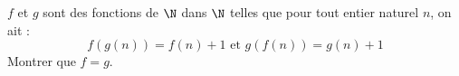 $f$ et $g$ sont des fonctions de $\N$ dans $\N$ telles que pour tout entier naturel $n$, on ait :
$$f(g(n)) = f(n) + 1 \text{ et } g(f(n)) = g(n) + 1$$
Montrer que $f = g$.